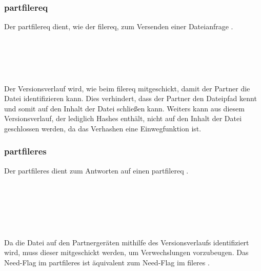\subsubsection{\gls{partfilereq}} \label{partnerfilerequest}
Der \gls{partfilereq} dient, wie der \gls{filereq}, zum Versenden einer Dateianfrage .
\messagestart
	\begin{rightwordgroup}{\isprotomsgtype}
	\end{rightwordgroup} \\
	
	\begin{rightwordgroup}{\isprotomsgdata}
		 \\
		\skippedwords \\
	\end{rightwordgroup}
\begin{description}
	Der Versionsverlauf wird, wie beim \gls{filereq} mitgeschickt, damit der Partner die Datei identifizieren kann. Dies verhindert, dass der Partner den Dateipfad kennt und somit auf den Inhalt der Datei schließen kann. Weiters kann aus diesem Versionsverlauf, der lediglich Hashes enthält, nicht auf den Inhalt der Datei geschlossen werden, da das Verhashen eine Einwegfunktion ist. 
\end{description}

\subsubsection{\gls{partfileres}}
Der \gls{partfileres} dient zum Antworten auf einen \gls{partfilereq} .
\messagestart
	\begin{rightwordgroup}{\isprotomsgtype}
	\end{rightwordgroup} \\
	
	\begin{rightwordgroup}{\isprotomsgdata}
		 \\
		\skippedwords \\
		\\
	\end{rightwordgroup}

\begin{description}
	Da die Datei auf den Partnergeräten mithilfe des Versionsverlaufs identifiziert wird, muss dieser mitgeschickt werden, um Verwechslungen vorzubeugen.
	Das Need-Flag im \gls{partfileres} ist äquivalent zum Need-Flag im \gls{fileres} .
\end{description}

